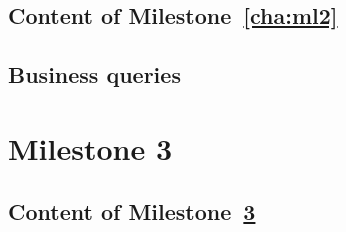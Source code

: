     \section{Content of Milestone~\ref{cha:ml2}} 
        \label{sec:ml2_content}
    

    \section{Business queries} \label{sec:ml2_queries}
    
    


\chapter{Milestone 3} \label{cha:ml3}
    \section{Content of Milestone~\ref{cha:ml3}} 
        \label{sec:ml3_content}
    




